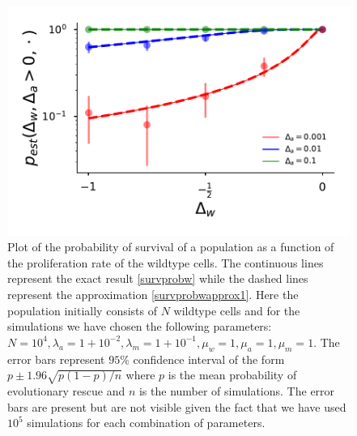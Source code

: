 \documentclass[12pt]{extarticle}
\begin{document}
\begin{figure}[!t]
 \vspace*{1\baselineskip}
\includegraphics[width=1\textwidth]{Figures/P_est_growth.pdf}
\caption{Plot of the probability of survival of a population as a function of the proliferation rate of the wildtype cells. The continuous lines represent the exact result \eqref{survprobw} while the dashed lines represent the approximation \eqref{survprobwapprox1}. Here the population initially consists of $N$ wildtype cells and for the simulations we have chosen the following parameters: $N=10^4, \lambda_a=1+10^{-2},\lambda_m=1+10^{-1},\mu_w=1,\mu_a=1,\mu_m=1$. The error bars represent $95\%$ confidence interval of the form $p\pm1.96\sqrt{p\left(1-p\right)/n}$ where $p$ is the mean probability of evolutionary rescue and $n$ is the number of simulations. The error bars are present but are not visible given the fact that we have used $10^5$ simulations for each combination of parameters.}
\label{SurvPlot}
\end{figure}
\end{document}
